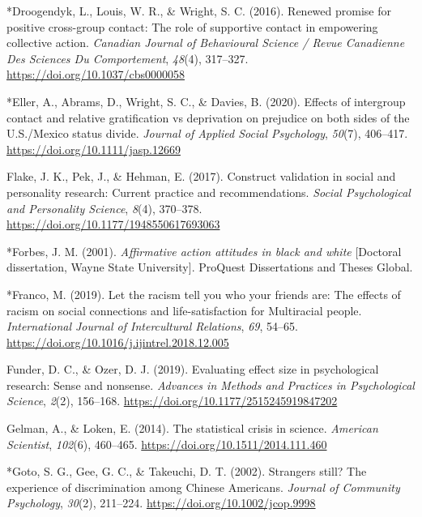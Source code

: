 \documentclass[12pt, letterpaper]{article}
\newenvironment{CSLReferences}[2]{}{}
\begin{document}
\begin{CSLReferences}{1}{0}
\leavevmode\hypertarget{ref-2033}{}%
*Droogendyk, L., Louis, W. R., \& Wright, S. C. (2016). Renewed promise
for positive cross-group contact: {The} role of supportive contact in
empowering collective action. \emph{Canadian Journal of Behavioural
Science / Revue Canadienne Des Sciences Du Comportement}, \emph{48}(4),
317--327. \url{https://doi.org/10.1037/cbs0000058}

\leavevmode\hypertarget{ref-4001}{}%
*Eller, A., Abrams, D., Wright, S. C., \& Davies, B. (2020). Effects of
intergroup contact and relative gratification vs deprivation on
prejudice on both sides of the {U}.{S}./{Mexico} status divide.
\emph{Journal of Applied Social Psychology}, \emph{50}(7), 406--417.
\url{https://doi.org/10.1111/jasp.12669}

\leavevmode\hypertarget{ref-flake_construct_2017}{}%
Flake, J. K., Pek, J., \& Hehman, E. (2017). Construct validation in
social and personality research: {Current} practice and recommendations.
\emph{Social Psychological and Personality Science}, \emph{8}(4),
370--378. \url{https://doi.org/10.1177/1948550617693063}

\leavevmode\hypertarget{ref-1549}{}%
*Forbes, J. M. (2001). \emph{Affirmative action attitudes in black and
white} {[}Doctoral dissertation, Wayne State University{]}. {ProQuest
Dissertations and Theses Global}.

\leavevmode\hypertarget{ref-325}{}%
*Franco, M. (2019). Let the racism tell you who your friends are: {The}
effects of racism on social connections and life-satisfaction for
{Multiracial} people. \emph{International Journal of Intercultural
Relations}, \emph{69}, 54--65.
\url{https://doi.org/10.1016/j.ijintrel.2018.12.005}

\leavevmode\hypertarget{ref-funder_evaluating_2019}{}%
Funder, D. C., \& Ozer, D. J. (2019). Evaluating effect size in
psychological research: Sense and nonsense. \emph{Advances in Methods
and Practices in Psychological Science}, \emph{2}(2), 156--168.
\url{https://doi.org/10.1177/2515245919847202}

\leavevmode\hypertarget{ref-gelman_statistical_2014}{}%
Gelman, A., \& Loken, E. (2014). The statistical crisis in science.
\emph{American Scientist}, \emph{102}(6), 460--465.
\url{https://doi.org/10.1511/2014.111.460}

\leavevmode\hypertarget{ref-1576}{}%
*Goto, S. G., Gee, G. C., \& Takeuchi, D. T. (2002). Strangers still?
{The} experience of discrimination among {Chinese} {Americans}.
\emph{Journal of Community Psychology}, \emph{30}(2), 211--224.
\url{https://doi.org/10.1002/jcop.9998}


\end{CSLReferences}
\end{document}
